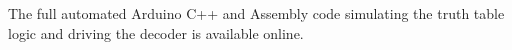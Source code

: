 \documentclass[12pt, a4paper]{article}
\begin{document}
																																																																																																																																																																																																																																																			
																																																																																																																																																																																																																																																				      \vspace{0.5cm}
																																																																																																																																																																																																																																																				      \begin{codebox}
																																																																																																																																																																																																																																																				          \centering
																																																																																																																																																																																																																																																					      \large The full automated Arduino C++ and Assembly code simulating the truth table logic and driving the decoder is available online. \\
																																																																																																																																																																																																																																																					          \vspace{0.4cm}
																																																																																																																																																																																																																																																						      

\end{codebox}
\end{document}
